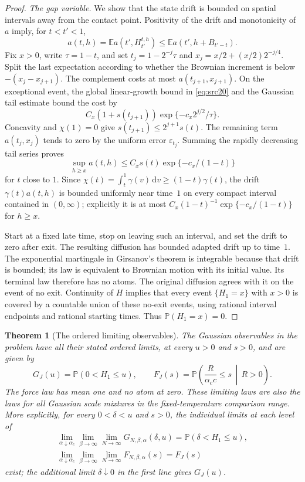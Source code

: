 \documentclass[11pt,a4paper]{article}
\numberwithin{equation}{section}
\newtheorem{theorem}{Theorem}[section]
\theoremstyle{definition}
\theoremstyle{remark}
\newcommand{\E}{\mathbb E}
\newcommand{\Prob}{\mathbb P}
\newcommand{\dd}{\mathrm d}
\newcommand{\eps}{\varepsilon}
\begin{document}
\begin{proof}
\emph{The gap variable.}
We show that the state drift is bounded on spatial intervals away from
the contact point.  Positivity of the drift and monotonicity of $a$ imply, for
$t<t'<1$,
\[
 a(t,h)=\E a(t',H_{t'}^{t,h})
              \le\E a(t',h+B_{t'-t}).
\]
Fix $x>0$, write $\tau=1-t$, and set
$t_j=1-2^{-j}\tau$ and
$x_j=x/2+(x/2)2^{-j/4}$.  Split the last expectation according to
whether the Brownian increment is below
$-(x_j-x_{j+1})$.  The complement costs at most $a(t_{j+1},x_{j+1})$.
On the exceptional event, the global linear-growth bound in
\eqref{eq:src20} and the Gaussian tail estimate bound the cost by
\[
 C_x(1+s(t_{j+1}))
                  \exp\{-c_x2^{j/2}/\tau\}.
\]
Concavity and $\chi(1)=0$ give
$s(t_{j+1})\le2^{j+1}s(t)$.  The remaining term
$a(t_j,x_j)$ tends to zero by the uniform error $\eps_{t_j}$.
Summing the rapidly decreasing tail series proves
\[
 \sup_{h\ge x}a(t,h)
           \le C_xs(t)\exp\{-c_x/(1-t)\}
\]
for $t$ close to $1$.  Since
$\chi(t)=\int_t^1\gamma(v)\,\dd v\ge(1-t)\gamma(t)$,
the drift $\gamma(t)a(t,h)$ is bounded uniformly near time~$1$
on every compact interval contained in $(0,\infty)$; explicitly it
is at most $C_x(1-t)^{-1}\exp\{-c_x/(1-t)\}$ for $h\ge x$.

Start at a fixed late time, stop on leaving such an interval, and
set the drift to zero after exit.  The resulting diffusion has
bounded adapted drift up to time~$1$.  The exponential martingale
in Girsanov's theorem is integrable because that drift is bounded;
its law is equivalent to Brownian motion with its initial value.
Its terminal law therefore has no atoms.  The original diffusion
agrees with it on the event of no exit.  Continuity of $H$ implies
that every event $\{H_1=x\}$ with $x>0$ is covered by a countable
union of these no-exit events, using rational interval endpoints
and rational starting times.  Thus $\Prob(H_1=x)=0$.
\end{proof}

\begin{theorem}[The ordered limiting observables]\label{crit:ordered-laws}
The Gaussian observables in the problem have all their stated ordered
limits, at every $u>0$ and $s>0$, and are given by
\begin{equation}\label{crit:limiting-laws}
 G_J(u)=\Prob(0<H_1\le u),\qquad
 F_J(s)=\Prob\left(\frac{R}{\alpha_c c}\le s\,\middle|\,R>0\right).
\end{equation}
The force law has mean one and no atom at zero.  These limiting laws
are also the laws for all Gaussian scale mixtures in the
fixed-temperature comparison range.
More explicitly, for every $0<\delta<u$ and $s>0$, the individual
limits at each level of
\begin{gather*}
 \lim_{\alpha\downarrow\alpha_c}\lim_{\beta\to\infty}
       \lim_{N\to\infty}G_{N,\beta,\alpha}(\delta,u)
                  =\Prob(\delta<H_1\le u),\\
 \lim_{\alpha\downarrow\alpha_c}\lim_{\beta\to\infty}
       \lim_{N\to\infty}F_{N,\beta,\alpha}(s)
                  =F_J(s)
\end{gather*}
exist; the additional limit $\delta\downarrow0$ in the first line
gives $G_J(u)$.
\end{theorem}
\end{document}
